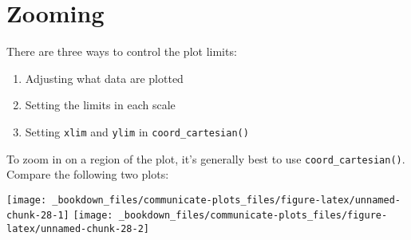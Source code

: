 \documentclass[]{book}
\newenvironment{Shaded}{\begin{snugshade}}{\end{snugshade}}
\newcommand{\KeywordTok}[1]{\textcolor[rgb]{0.13,0.29,0.53}{\textbf{{#1}}}}
\newcommand{\DataTypeTok}[1]{\textcolor[rgb]{0.13,0.29,0.53}{{#1}}}
\newcommand{\DecValTok}[1]{\textcolor[rgb]{0.00,0.00,0.81}{{#1}}}
\newcommand{\StringTok}[1]{\textcolor[rgb]{0.31,0.60,0.02}{{#1}}}
\newcommand{\NormalTok}[1]{{#1}}
\providecommand{\tightlist}{%
  \setlength{\itemsep}{0pt}\setlength{\parskip}{0pt}}
\begin{document}
\section{Zooming}\label{zooming}

There are three ways to control the plot limits:

\begin{enumerate}
\def\labelenumi{\arabic{enumi}.}
\tightlist
\item
  Adjusting what data are plotted
\item
  Setting the limits in each scale
\item
  Setting \texttt{xlim} and \texttt{ylim} in \texttt{coord\_cartesian()}
\end{enumerate}

To zoom in on a region of the plot, it's generally best to use
\texttt{coord\_cartesian()}. Compare the following two plots:

\begin{Shaded}
\end{Shaded}

\texttt{[image: \_bookdown\_files/communicate-plots\_files/figure-latex/unnamed-chunk-28-1]}
\texttt{[image: \_bookdown\_files/communicate-plots\_files/figure-latex/unnamed-chunk-28-2]}
\end{document}
